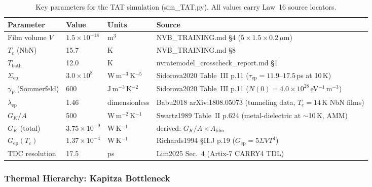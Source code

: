 \begin{table}[ht]
\centering
\caption{Key parameters for the TAT simulation (sim\_TAT.py).
All values carry Law~16 source locators.}
\label{tab:tat_params}
\small
\begin{tabular}{@{}llll@{}}
\toprule
Parameter & Value & Units & Source \\
\midrule
Film volume $V$ & $1.5 \times 10^{-18}$ & m$^3$ & NVB\_TRAINING.md \S4 ($5\times1.5\times0.2\,\mu$m) \\
$T_c$ (NbN) & 15.7 & K & NVB\_TRAINING.md \S8 \\
$T_\mathrm{bath}$ & 12.0 & K & nvratemodel\_crosscheck\_report.md \S1 \\
$\Sigma_\mathrm{ep}$ & $3.0 \times 10^8$ & W\,m$^{-3}$\,K$^{-5}$ & Sidorova2020 Table~III p.11 ($\tau_\mathrm{ep} = 11.9$--$17.5$\,ps at 10\,K) \\
$\gamma_V$ (Sommerfeld) & 600 & J\,m$^{-3}$\,K$^{-2}$ & Sidorova2020 Table~III p.11 ($N(0) = 4.0 \times 10^{28}$\,eV$^{-1}$\,m$^{-3}$) \\
$\lambda_\mathrm{ep}$ & 1.46 & dimensionless & Babu2018 arXiv:1808.05073 (tunneling data, $T_c = 14$\,K NbN films) \\
$G_K/A$ & 500 & W\,m$^{-2}$\,K$^{-1}$ & Swartz1989 Table~II p.624 (metal-dielectric at $\sim$10\,K, AMM) \\
$G_K$ (total) & $3.75 \times 10^{-9}$ & W\,K$^{-1}$ & derived: $G_K/A \times A_\mathrm{film}$ \\
$G_\mathrm{ep}(T_c)$ & $1.37 \times 10^{-4}$ & W\,K$^{-1}$ & Richards1994 \S II.J p.19 ($G_\mathrm{ep} = 5\Sigma V T^4$) \\
TDC resolution & 17.5 & ps & Lim2025 Sec.~4 (Artix-7 CARRY4 TDL) \\
\bottomrule
\end{tabular}
\end{table}

\subsubsection{Thermal Hierarchy: Kapitza Bottleneck}
\label{sec:oq5_tat_hierarchy}

